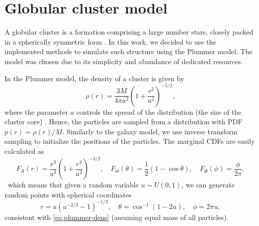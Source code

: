 \section{Globular cluster model}\label{sec:globular-cluster-model}
A globular cluster is a formation comprising a large number stars, closely packed in a spherically symmetric form \cite{britannica2024globular}.
In this work, we decided to use the implemented methods to simulate such structure using the Plummer model.
The model was chosen due to its simplicity and abundance of dedicated resources.

In the Plummer model, the density of a cluster is given by
\begin{equation}\label{eq:plummer-dens}
    \rho(r) = \frac{3M}{4\pi a^2}\left(1 + \frac{r^2}{a^2} \right)^{-5/2},
\end{equation}
where the parameter $a$ controls the spread of the distribution (the size of the cluster core) \cite{Aarseth1974Comparison}.
Hence, the particles are sampled from a distribution with PDF $p(r) = \rho(r) / M$.
Similarly to the galaxy model, we use inverse transform sampling to initialize the positions of the particles.
The marginal CDFs are easily calculated as
\begin{equation*}
    F_R(r) = \frac{r^3}{a^3}\left( 1+\frac{r^2}{a^2} \right)^{-3/2}, \quad
    F_\Theta (\theta) = \frac{1}{2}(1-\cos\theta), \quad
    F_\Phi (\phi) = \frac{\phi}{2\pi},
\end{equation*}\
which means that given a random variable $u\sim U(0, 1)$, we can generate random points with spherical coordinates
\begin{equation}\label{eq:plummer-random-init-pos}
    r = a(u^{-2/3}-1)^{-1/2}, \quad \theta = \cos^{-1}(1-2u), \quad \phi = 2\pi u,
\end{equation}
consistent with \autoref{eq:plummer-dens} (assuming equal mass of all particles).

